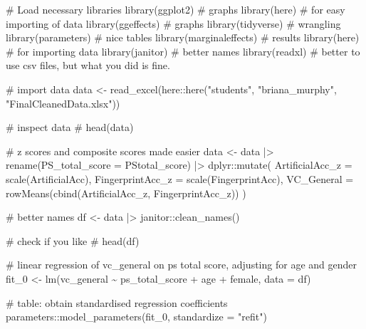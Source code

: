 \documentclass[
  single column]{article}
\newenvironment{Shaded}{\begin{snugshade}}{\end{snugshade}}
\newcommand{\AttributeTok}[1]{\textcolor[rgb]{0.40,0.45,0.13}{#1}}
\newcommand{\CommentTok}[1]{\textcolor[rgb]{0.37,0.37,0.37}{#1}}
\newcommand{\FunctionTok}[1]{\textcolor[rgb]{0.28,0.35,0.67}{#1}}
\newcommand{\NormalTok}[1]{\textcolor[rgb]{0.00,0.23,0.31}{#1}}
\newcommand{\OtherTok}[1]{\textcolor[rgb]{0.00,0.23,0.31}{#1}}
\newcommand{\SpecialCharTok}[1]{\textcolor[rgb]{0.37,0.37,0.37}{#1}}
\newcommand{\StringTok}[1]{\textcolor[rgb]{0.13,0.47,0.30}{#1}}
\begin{document}
\begin{Shaded}
\begin{Highlighting}[]
\CommentTok{\# Load necessary libraries}
\FunctionTok{library}\NormalTok{(ggplot2) }\CommentTok{\# graphs}
\FunctionTok{library}\NormalTok{(here) }\CommentTok{\# for easy importing of data}
\FunctionTok{library}\NormalTok{(ggeffects) }\CommentTok{\# graphs}
\FunctionTok{library}\NormalTok{(tidyverse) }\CommentTok{\# wrangling }
\FunctionTok{library}\NormalTok{(parameters) }\CommentTok{\# nice tables}
\FunctionTok{library}\NormalTok{(marginaleffects) }\CommentTok{\# results}
\FunctionTok{library}\NormalTok{(here) }\CommentTok{\# for importing data}
\FunctionTok{library}\NormalTok{(janitor) }\CommentTok{\# better names}
\FunctionTok{library}\NormalTok{(readxl) }\CommentTok{\# better to use csv files, but what you did is fine. }

\CommentTok{\# import data}
\NormalTok{data }\OtherTok{\textless{}{-}} \FunctionTok{read\_excel}\NormalTok{(here}\SpecialCharTok{::}\FunctionTok{here}\NormalTok{(}\StringTok{"students"}\NormalTok{, }\StringTok{"briana\_murphy"}\NormalTok{, }\StringTok{"FinalCleanedData.xlsx"}\NormalTok{))}

\CommentTok{\# inspect data}
\CommentTok{\# head(data)}

\CommentTok{\# z scores and composite scores made easier}
\NormalTok{data }\OtherTok{\textless{}{-}}\NormalTok{ data }\SpecialCharTok{|\textgreater{}} 
  \FunctionTok{rename}\NormalTok{(}\AttributeTok{PS\_total\_score =}\NormalTok{ PStotal\_score) }\SpecialCharTok{|\textgreater{}} 
\NormalTok{  dplyr}\SpecialCharTok{::}\FunctionTok{mutate}\NormalTok{(}
    \AttributeTok{ArtificialAcc\_z =} \FunctionTok{scale}\NormalTok{(ArtificialAcc), }
    \AttributeTok{FingerprintAcc\_z =} \FunctionTok{scale}\NormalTok{(FingerprintAcc),}
    \AttributeTok{VC\_General =} \FunctionTok{rowMeans}\NormalTok{(}\FunctionTok{cbind}\NormalTok{(ArtificialAcc\_z, FingerprintAcc\_z))}
\NormalTok{  )}

\CommentTok{\# better names}
\NormalTok{df }\OtherTok{\textless{}{-}}\NormalTok{ data }\SpecialCharTok{|\textgreater{}} 
\NormalTok{  janitor}\SpecialCharTok{::}\FunctionTok{clean\_names}\NormalTok{()}

\CommentTok{\# check if you like}
\CommentTok{\# head(df)}

\CommentTok{\# linear regression of vc\_general on ps total score, adjusting for age and gender}
\NormalTok{fit\_0 }\OtherTok{\textless{}{-}} \FunctionTok{lm}\NormalTok{(vc\_general  }\SpecialCharTok{\textasciitilde{}}\NormalTok{ ps\_total\_score }\SpecialCharTok{+}\NormalTok{  age }\SpecialCharTok{+}\NormalTok{ female, }\AttributeTok{data =}\NormalTok{ df) }

\CommentTok{\# table: obtain standardised regression coefficients}
\NormalTok{parameters}\SpecialCharTok{::}\FunctionTok{model\_parameters}\NormalTok{(fit\_0, }\AttributeTok{standardize =} \StringTok{"refit"}\NormalTok{)}
\end{Highlighting}
\end{Shaded}
\end{document}
